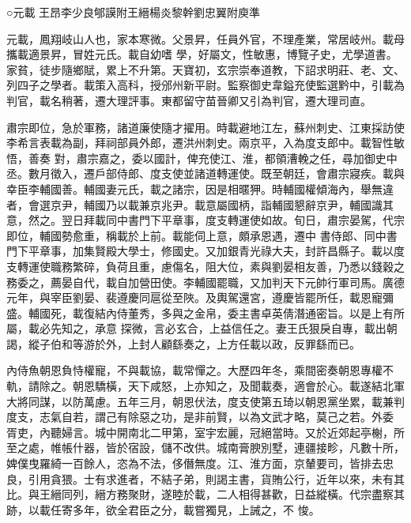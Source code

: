 
\begin{pinyinscope}

 ○元載
 王昂李少良郇謨附王縉楊炎黎幹劉忠翼附庾準



 元載，鳳翔岐山人也，家本寒微。父景昇，任員外官，不理產業，常居岐州。載母攜載適景昇，冒姓元氏。載自幼嗜
 學，好屬文，性敏惠，博覽子史，尤學道書。家貧，徒步隨鄉賦，累上不升第。天寶初，玄宗崇奉道教，下詔求明莊、老、文、列四子之學者。載策入高科，授邠州新平尉。監察御史韋鎰充使監選黔中，引載為判官，載名稍著，遷大理評事。東都留守苗晉卿又引為判官，遷大理司直。



 肅宗即位，急於軍務，諸道廉使隨才擢用。時載避地江左，蘇州刺史、江東採訪使李希言表載為副，拜祠部員外郎，遷洪州刺史。兩京平，入為度支郎中。載智性敏悟，善奏
 對，肅宗嘉之，委以國計，俾充使江、淮，都領漕輓之任，尋加御史中丞。數月徵入，遷戶部侍郎、度支使並諸道轉運使。既至朝廷，會肅宗寢疾。載與幸臣李輔國善。輔國妻元氏，載之諸宗，因是相暱狎。時輔國權傾海內，舉無違者，會選京尹，輔國乃以載兼京兆尹。載意屬國柄，詣輔國懇辭京尹，輔國識其意，然之。翌日拜載同中書門下平章事，度支轉運使如故。旬日，肅宗晏駕，代宗即位，輔國勢愈重，稱載於上前。載能伺上意，頗承恩遇，遷中
 書侍郎、同中書門下平章事，加集賢殿大學士，修國史。又加銀青光祿大夫，封許昌縣子。載以度支轉運使職務繁碎，負荷且重，慮傷名，阻大位，素與劉晏相友善，乃悉以錢穀之務委之，薦晏自代，載自加營田使。李輔國罷職，又加判天下元帥行軍司馬。廣德元年，與宰臣劉晏、裴遵慶同扈從至陜。及輿駕還宮，遵慶皆罷所任，載恩寵彌盛。輔國死，載復結內侍董秀，多與之金帛，委主書卓英倩潛通密旨。以是上有所屬，載必先知之，承意
 探微，言必玄合，上益信任之。妻王氏狠戾自專，載出朝謁，縱子伯和等游於外，上封人顧繇奏之，上方任載以政，反罪繇而已。



 內侍魚朝恩負恃權寵，不與載協，載常憚之。大歷四年冬，乘間密奏朝恩專權不軌，請除之。朝恩驕橫，天下咸怒，上亦知之，及聞載奏，適會於心。載遂結北軍大將同謀，以防萬慮。五年三月，朝恩伏法，度支使第五琦以朝恩黨坐累，載兼判度支，志氣自若，謂己有除惡之功，是非前賢，以為文武才略，莫己之若。外委
 胥吏，內聽婦言。城中開南北二甲第，室宇宏麗，冠絕當時。又於近郊起亭榭，所至之處，帷帳什器，皆於宿設，儲不改供。城南膏腴別墅，連疆接畛，凡數十所，婢僕曳羅綺一百餘人，恣為不法，侈僭無度。江、淮方面，京輦要司，皆排去忠良，引用貪猥。士有求進者，不結子弟，則謁主書，貨賄公行，近年以來，未有其比。與王縉同列，縉方務聚財，遂睦於載，二人相得甚歡，日益縱橫。代宗盡察其跡，以載任寄多年，欲全君臣之分，載嘗獨見，上誡之，不
 悛。




\end{pinyinscope}

